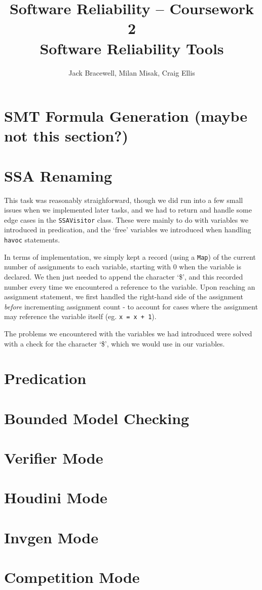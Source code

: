 \documentclass[11pt]{article}
\title{Software Reliability -- Coursework 2 \\ Software Reliability Tools}
\author{Jack Bracewell, Milan Misak, Craig Ellis}
\date{}
\begin{document}
\maketitle

\section{SMT Formula Generation (maybe not this section?)}
\section{SSA Renaming}

This task was reasonably straighforward, though we did run into a few small issues when we implemented later tasks, and we had to return and handle some edge cases in the \verb|SSAVisitor| class. These were mainly to do with variables we introduced in predication, and the `free' variables we introduced when handling \verb|havoc| statements.

In terms of implementation, we simply kept a record (using a \verb|Map|) of the current number of assignments to each variable, starting with 0 when the variable is declared. We then just needed to append the character `\$', and this recorded number every time we encountered a reference to the variable. Upon reaching an assignment statement, we first handled the right-hand side of the assignment \emph{before} incrementing assignment count - to account for cases where the assignment may reference the variable itself (eg. \verb|x = x + 1|).

The problems we encountered with the variables we had introduced were solved with a check for the character `\$', which we would use in our variables.

\section{Predication}



\section{Bounded Model Checking}
\section{Verifier Mode}
\section{Houdini Mode}
\section{Invgen Mode}
\section{Competition Mode}
\end{document}
